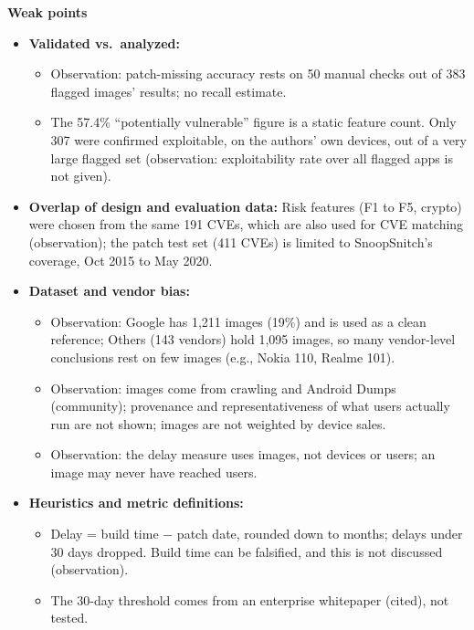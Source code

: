 \documentclass[11pt,a4paper]{article}
\begin{document}
\begin{enumerate}
    \vspace{4pt}
    \textbf{Weak points}
    \begin{itemize}[leftmargin=*,itemsep=1pt,topsep=2pt]
        \item \textbf{Validated vs.\ analyzed:}
        \begin{itemize}[itemsep=0pt]
            \item Observation: patch-missing accuracy rests on 50 manual checks out of 383 flagged images' results; no recall estimate.
            \item The 57.4\% ``potentially vulnerable'' figure is a static feature count. Only 307 were confirmed exploitable, on the authors' own devices, out of a very large flagged set (observation: exploitability rate over all flagged apps is not given).
        \end{itemize}
        \item \textbf{Overlap of design and evaluation data:} Risk features (F1 to F5, crypto) were chosen from the same 191 CVEs, which are also used for CVE matching (observation); the patch test set (411 CVEs) is limited to SnoopSnitch's coverage, Oct 2015 to May 2020.
        \item \textbf{Dataset and vendor bias:}
        \begin{itemize}[itemsep=0pt]
            \item Observation: Google has 1,211 images (19\%) and is used as a clean reference; Others (143 vendors) hold 1,095 images, so many vendor-level conclusions rest on few images (e.g., Nokia 110, Realme 101).
            \item Observation: images come from crawling and Android Dumps (community); provenance and representativeness of what users actually run are not shown; images are not weighted by device sales.
            \item Observation: the delay measure uses images, not devices or users; an image may never have reached users.
        \end{itemize}
        \item \textbf{Heuristics and metric definitions:}
        \begin{itemize}[itemsep=0pt]
            \item Delay = build time $-$ patch date, rounded down to months; delays under 30 days dropped. Build time can be falsified, and this is not discussed (observation).
            \item The 30-day threshold comes from an enterprise whitepaper (cited), not tested.

\end{itemize}
\end{itemize}
\end{enumerate}
\end{document}
